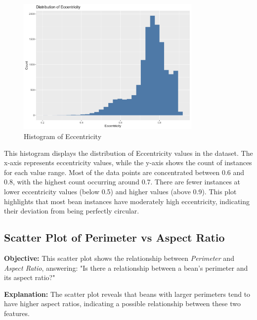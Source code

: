 \documentclass[a4paper,12pt]{article}
\begin{document}
\begin{figure}[H]
    \centering
    \includegraphics[width=0.8\textwidth]{graphs/histogram_eccentricity.png}
    \caption{Histogram of Eccentricity}
    \label{fig:histogram_eccentricity}
\end{figure}
This histogram displays the distribution of Eccentricity values in the dataset. The x-axis represents eccentricity values, while the y-axis shows the count of instances for each value range. Most of the data points are concentrated between 0.6 and 0.8, with the highest count occurring around 0.7. There are fewer instances at lower eccentricity values (below 0.5) and higher values (above 0.9). This plot highlights that most bean instances have moderately high eccentricity, indicating their deviation from being perfectly circular.

\newpage

\subsection{Scatter Plot of Perimeter vs Aspect Ratio}
\noindent\textbf{Objective:} This scatter plot shows the relationship between \textit{Perimeter} and \textit{Aspect Ratio}, answering: "Is there a relationship between a bean's perimeter and its aspect ratio?"

\noindent\textbf{Explanation:} The scatter plot reveals that beans with larger perimeters tend to have higher aspect ratios, indicating a possible relationship between these two features.
\end{document}
